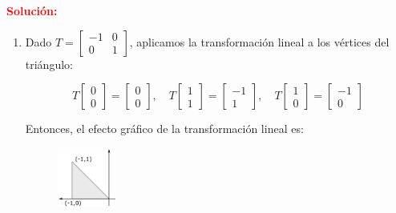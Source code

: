 \documentclass[12pt]{article}
\begin{document}
\noindent \textcolor{red}{\bf Solución:}
\begin{enumerate}[label=(\alph*)]

\item Dado $T = \begin{bmatrix}
                    -1 & 0 \\
                     0 & 1
                \end{bmatrix}$, aplicamos la transformación lineal a los vértices del triángulo:
    
\begin{equation}
    T \begin{bmatrix}
        0 \\ 
        0
    \end{bmatrix} = \begin{bmatrix}
                        0 \\ 
                        0
                    \end{bmatrix} 
    ,\quad
    T \begin{bmatrix}
        1 \\ 
        1
    \end{bmatrix} = \begin{bmatrix}
                        -1 \\ 
                         1
                    \end{bmatrix}
    ,\quad
    T \begin{bmatrix}
        1 \\ 
        0
    \end{bmatrix} = \begin{bmatrix}
                        -1 \\ 
                         0
                    \end{bmatrix}
\end{equation}

Entonces, el efecto gráfico de la transformación lineal es:

\begin{figure}[htbp]
    \centering
    \includegraphics[width=0.18\textwidth]{17a.png}
\end{figure}


\end{enumerate}
\end{document}
